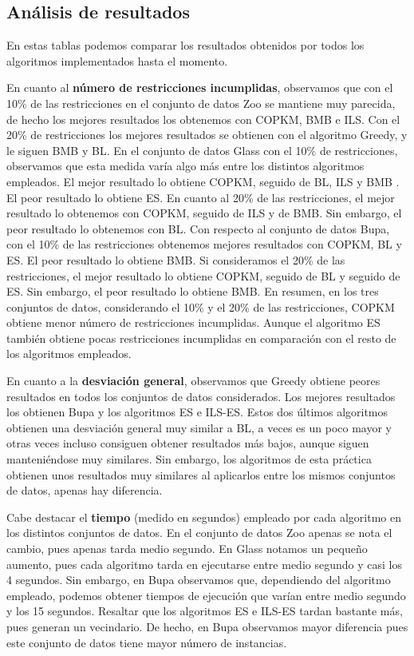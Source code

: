 \subsection{Análisis de resultados}

En estas tablas podemos comparar los resultados obtenidos por todos los algoritmos implementados hasta el momento.

En cuanto al \textbf{número de restricciones incumplidas}, observamos que con el 10\% de las restricciones en el conjunto de datos Zoo se mantiene muy parecida, de hecho los mejores resultados los obtenemos con COPKM, BMB e ILS.
Con el 20\% de restricciones los mejores resultados se obtienen con el algoritmo Greedy, y le siguen BMB y BL.
En el conjunto de datos Glass con el 10\% de restricciones, observamos que esta medida varía algo más entre los distintos algoritmos empleados. El mejor resultado lo obtiene COPKM, seguido de BL, ILS y BMB . El peor resultado lo obtiene ES.
En cuanto al 20\% de las restricciones, el mejor resultado lo obtenemos con COPKM, seguido de ILS y de BMB. Sin embargo, el peor resultado lo obtenemos con BL.
Con respecto al conjunto de datos Bupa, con el 10\% de las restricciones obtenemos mejores resultados con COPKM, BL y ES. El peor resultado lo obtiene BMB.
Si consideramos el 20\% de las restricciones, el mejor resultado lo obtiene COPKM, seguido de BL y seguido de ES. Sin embargo, el peor resultado lo obtiene BMB.
En resumen, en los tres conjuntos de datos, considerando el 10\% y el 20\% de las restricciones, COPKM obtiene menor número de restricciones incumplidas. Aunque el algoritmo ES también obtiene pocas restricciones incumplidas en comparación con el resto de los algoritmos empleados.

En cuanto a la \textbf{desviación general}, observamos que Greedy obtiene peores resultados en todos los conjuntos de datos considerados. Los mejores resultados los obtienen Bupa y los algoritmos ES e ILS-ES.
Estos dos últimos algoritmos obtienen una desviación general muy similar a BL, a veces es un poco mayor y otras veces incluso consiguen obtener resultados más bajos, aunque siguen manteniéndose muy similares. Sin embargo, los algoritmos de esta práctica obtienen unos resultados muy similares al aplicarlos
entre los mismos conjuntos de datos, apenas hay diferencia.

Cabe destacar el \textbf{tiempo} (medido en segundos) empleado por cada algoritmo en los distintos conjuntos de datos. En el conjunto de datos Zoo apenas se nota el cambio, pues apenas tarda medio segundo. En Glass notamos un pequeño aumento, pues cada algoritmo tarda en ejecutarse entre medio segundo y casi los 4 segundos. Sin embargo, en Bupa observamos que, dependiendo del algoritmo empleado, podemos obtener tiempos de ejecución que varían entre medio segundo y los 15 segundos.
Resaltar que los algoritmos ES e ILS-ES tardan bastante más, pues generan un vecindario. De hecho, en Bupa observamos mayor diferencia pues este conjunto de datos tiene mayor número de instancias.

